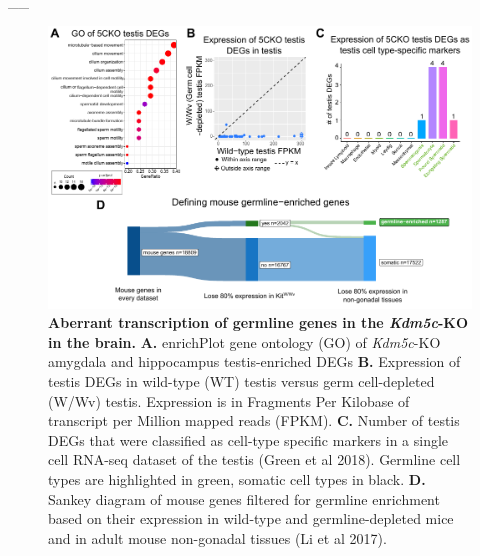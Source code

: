 \documentclass[
]{article}
\begin{document}
\_\_

\begin{figure}
  \centering 
  \includegraphics{../submission/compiled_figs/What_are_germline_genes.pdf}
  \caption[Aberrant transcription of germline genes in the \textit{Kdm5c}-KO in the brain]{\textbf{Aberrant transcription of germline genes in the \textit{Kdm5c}-KO in the brain.} \textbf{A.} enrichPlot gene ontology (GO) of \textit{Kdm5c}-KO amygdala and hippocampus testis-enriched DEGs \textbf{B.} Expression of testis DEGs in wild-type (WT) testis versus germ cell-depleted (W/Wv) testis. Expression is in Fragments Per Kilobase of transcript per Million mapped reads (FPKM). \textbf{C.} Number of testis DEGs that were classified as cell-type specific markers in a single cell RNA-seq dataset of the testis (Green et al 2018). Germline cell types are highlighted in green, somatic cell types in black. \textbf{D.} Sankey diagram of mouse genes filtered for germline enrichment based on their expression in wild-type and germline-depleted mice and in adult mouse non-gonadal tissues (Li et al 2017).}
  \label{figurelabel}
\end{figure}
\end{document}
